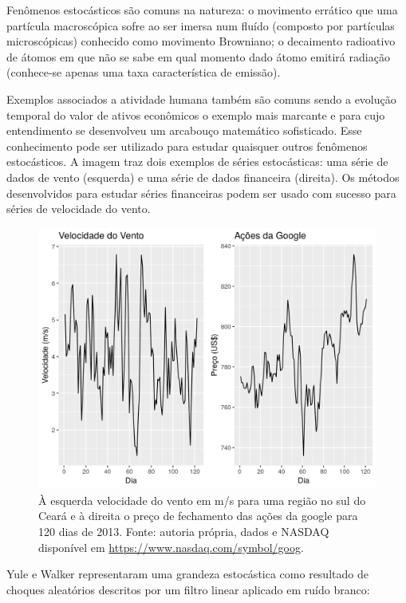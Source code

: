 \documentclass[
	12pt,				%
	openright,			%
	oneside,			%
	a4paper,			%
	english,			%
	french,				%
	spanish,			%
	brazil				%
	]{abntex2}
\begin{document}
Fenômenos estocásticos são comuns na natureza: o movimento errático que uma partícula macroscópica sofre ao ser 
imersa num fluído (composto por partículas microscópicas) conhecido como movimento Browniano; o decaimento radioativo de átomos em que não se sabe em qual momento dado átomo emitirá radiação (conhece-se apenas uma taxa característica de emissão). 

Exemplos associados a atividade humana também são comuns sendo a evolução temporal do valor de ativos econômicos o exemplo mais marcante e para cujo entendimento se desenvolveu um arcabouço matemático sofisticado. Esse conhecimento pode ser utilizado para estudar quaisquer outros fenômenos estocásticos. A imagem traz dois exemplos de séries estocásticas: uma série de dados de vento (esquerda) e uma série de dados financeira (direita). Os métodos desenvolvidos para estudar séries financeiras podem ser usado com sucesso para séries de velocidade do vento.

\begin{figure}[h]
    \centering
	\includegraphics[width=\textwidth]{wind_money}
	\caption{À esquerda velocidade do vento em m/s para uma região no sul do Ceará e à direita o preço de fechamento das ações da google para 120 dias de 2013. Fonte: autoria própria, dados \cite{era5} e NASDAQ disponível em \url{https://www.nasdaq.com/symbol/goog}.}
\end{figure}
\FloatBarrier

Yule e Walker representaram uma grandeza estocástica como resultado de choques aleatórios descritos por um filtro linear aplicado em ruído branco:
\end{document}
